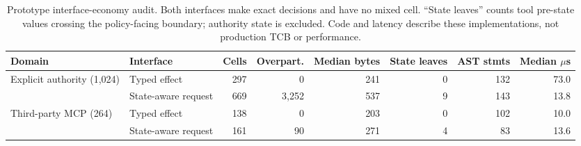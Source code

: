 \begin{table}[t]
\centering
\scriptsize
\setlength{\tabcolsep}{4pt}
\caption{Prototype interface-economy audit. Both interfaces make exact
decisions and have no mixed cell. ``State leaves'' counts tool pre-state values
crossing the policy-facing boundary; authority state is excluded. Code and
latency describe these implementations, not production TCB or performance.}
\label{tab:interface-economy}
\begin{tabular}{llrrrrrr}
\toprule
Domain & Interface & Cells & Overpart. & Median bytes & State leaves & AST stmts & Median $\mu$s \\
\midrule
Explicit authority (1,024) & Typed effect & 297 & 0 & 241 & 0 & 132 & 73.0 \\
 & State-aware request & 669 & 3,252 & 537 & 9 & 143 & 13.8 \\
Third-party MCP (264) & Typed effect & 138 & 0 & 203 & 0 & 102 & 10.0 \\
 & State-aware request & 161 & 90 & 271 & 4 & 83 & 13.6 \\
\bottomrule
\end{tabular}
\end{table}
